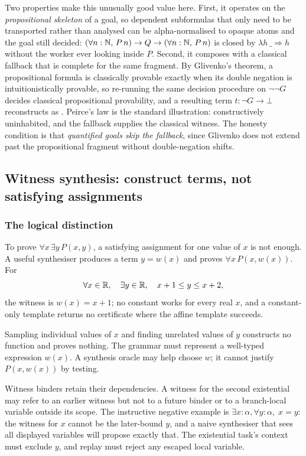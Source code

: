 Two properties make this unusually good value here. First, it operates on the
\emph{propositional skeleton} of a goal, so dependent subformulas that only
need to be transported rather than analysed can be alpha-normalised to opaque
atoms and the goal still decided: $(\forall n:\mathbb{N},\,P\,n)\to Q\to(\forall
n:\mathbb{N},\,P\,n)$ is closed by $\lambda h\,\_\Rightarrow h$ without the worker ever
looking inside $P$. Second, it composes with a classical fallback that is
complete for the same fragment. By Glivenko's theorem, a propositional formula
is classically provable exactly when its double negation is intuitionistically
provable, so re-running the same decision procedure on $\neg\neg G$ decides
classical propositional provability, and a resulting term
$t:\neg G\to\bot$ reconstructs as .
Peirce's law is the standard illustration: constructively uninhabited, and the
fallback supplies the classical witness. The honesty condition is that
\emph{quantified goals skip the fallback}, since Glivenko does not extend past
the propositional fragment without double-negation shifts.

\subsection{Witness synthesis: construct terms, not satisfying assignments}

\subsubsection*{The logical distinction}

To prove $\forall x\,\exists y\,P(x,y)$, a satisfying assignment for one value
of $x$ is not enough. A useful synthesiser produces a term $y=w(x)$ and proves
$\forall x\,P(x,w(x))$. For
\[
\forall x\in\mathbb{R},\quad \exists y\in\mathbb{R},\quad x+1\le y\le x+2,
\]
the witness is $w(x)=x+1$; no constant works for every real $x$, and a
constant-only template returns no certificate where the affine template
succeeds.

Sampling individual values of $x$ and finding unrelated values of $y$
constructs no function and proves nothing. The grammar must represent a
well-typed expression $w(x)$. A synthesis oracle may help choose $w$; it cannot
justify $P(x,w(x))$ by testing.

Witness binders retain their dependencies. A witness for the second existential
may refer to an earlier witness but not to a future binder or to a branch-local
variable outside its scope. The instructive negative example is
$\exists x:\alpha,\forall y:\alpha,\;x=y$: the witness for $x$ cannot be the
later-bound $y$, and a naive synthesiser that sees all displayed variables will
propose exactly that. The existential task's context must exclude $y$, and
replay must reject any escaped local variable.

